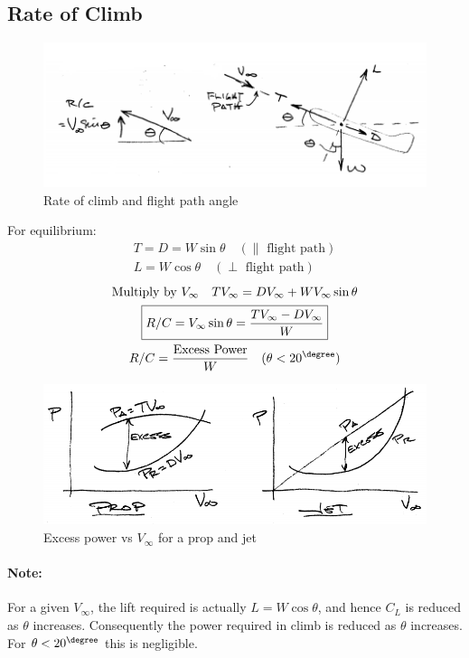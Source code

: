\documentclass[draft=false, titlepage]{article}
\begin{document}
\subsection{Rate of Climb}
 \begin{figure}[ht]
	\centering
	\includegraphics[width=0.8\linewidth]{Figures/p77_rateOfClimb}
	\caption{Rate of climb and flight path angle}
	\label{fig:p77_rateOfClimb}
\end{figure}
For equilibrium:
\begin{gather}
T = D = W\sin\theta \quad (\parallel \text{ flight path})\\
L = W\cos\theta \quad (\perp \text{ flight path})
\end{gather}
\begin{gather*}
\text{Multiply by } V_\infty \quad TV_\infty = DV_\infty + WV_\infty\sin\theta\\
\boxed{R/C = V_\infty \sin\theta = \frac{TV_\infty - DV_\infty}{W}}\\
R/C = \frac{\text{Excess Power}}{W} \quad (\theta < 20^\degree)
\end{gather*}
 \begin{figure}[ht]
	\centering
	\includegraphics[width=0.7\linewidth]{Figures/p77_excessPower}
	\caption{Excess power vs $V_\infty$ for a prop and jet}
	\label{fig:p77_excessPower}
\end{figure}

\paragraph*{Note:} For a given $V_\infty$, the lift required is actually $L=W\cos\theta$, and hence $C_L$ is reduced as $\theta$ increases. Consequently the power required in climb is reduced as $\theta$ increases. For $\theta < 20^\degree$ this is negligible.
\end{document}
